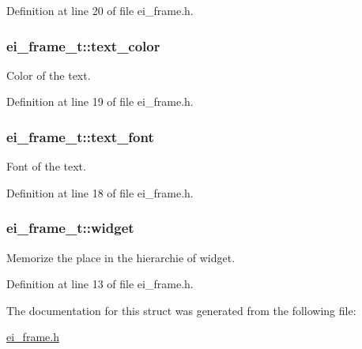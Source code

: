 Definition at line 20 of file ei\+\_\+frame.\+h.

\hypertarget{structei__frame__t_adf806a6e4efd6a6fb28a286344c3448c}{
\subsubsection[{text\+\_\+color}]{ ei\+\_\+frame\+\_\+t\+::text\+\_\+color}}\label{structei__frame__t_adf806a6e4efd6a6fb28a286344c3448c}


Color of the text. 



Definition at line 19 of file ei\+\_\+frame.\+h.

\hypertarget{structei__frame__t_a9ecc6a5030ccee171098b953014b1798}{
\subsubsection[{text\+\_\+font}]{ ei\+\_\+frame\+\_\+t\+::text\+\_\+font}}\label{structei__frame__t_a9ecc6a5030ccee171098b953014b1798}


Font of the text. 



Definition at line 18 of file ei\+\_\+frame.\+h.

\hypertarget{structei__frame__t_a712db0711a6f2da5e96df73f562572b6}{
\subsubsection[{widget}]{ ei\+\_\+frame\+\_\+t\+::widget}}\label{structei__frame__t_a712db0711a6f2da5e96df73f562572b6}


Memorize the place in the hierarchie of widget. 



Definition at line 13 of file ei\+\_\+frame.\+h.



The documentation for this struct was generated from the following file\+:\begin{DoxyCompactItemize}
\item 
\hyperlink{ei__frame_8h}{ei\+\_\+frame.\+h}\end{DoxyCompactItemize}
